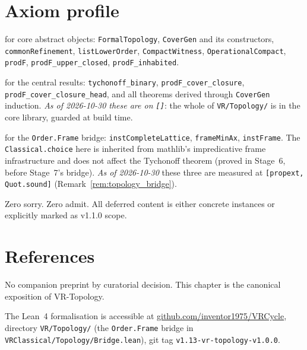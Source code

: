 \section{Axiom profile}
\label{sec:topology_axiom_profile}

\axiomprofile{[]} for core abstract objects: \texttt{FormalTopology},
\texttt{CoverGen} and its constructors, \texttt{commonRefinement},
\texttt{listLowerOrder}, \texttt{CompactWitness}, \texttt{OperationalCompact},
\texttt{prodF}, \texttt{prodF\_upper\_closed}, \texttt{prodF\_inhabited}.

 for the central results:
\texttt{tychonoff\_binary}, \texttt{prodF\_cover\_closure},
\texttt{prodF\_cover\_closure\_head}, and all theorems derived through
\texttt{CoverGen} induction.  \emph{As of 2026-10-30 these are on \texttt{[]}}: the whole
of \texttt{VR/Topology/} is in the core library, guarded at build time.

 for the
\texttt{Order.Frame} bridge: \texttt{instCompleteLattice},
\texttt{frameMinAx}, \texttt{instFrame}.  The \texttt{Classical.choice}
here is inherited from mathlib's impredicative frame infrastructure
and does not affect the Tychonoff theorem (proved in Stage~6, before
Stage~7's bridge).  \emph{As of 2026-10-30} these three are measured at
\texttt{[propext, Quot.sound]} (Remark~\ref{rem:topology_bridge}).

Zero sorry.  Zero admit.  All deferred content is either concrete instances
or explicitly marked as v1.1.0 scope.

\section{References}
\label{sec:topology_refs}

No companion preprint by curatorial decision.  This chapter is the
canonical exposition of VR-Topology.

The Lean~4 formalisation is accessible at
\href{https://github.com/inventor1975/VRCycle}{github.com/inventor1975/VRCycle},
directory \texttt{VR/Topology/} (the \texttt{Order.Frame} bridge in
\texttt{VRClassical/Topology/Bridge.lean}),
git tag \texttt{v1.13-vr-topology-v1.0.0}.
